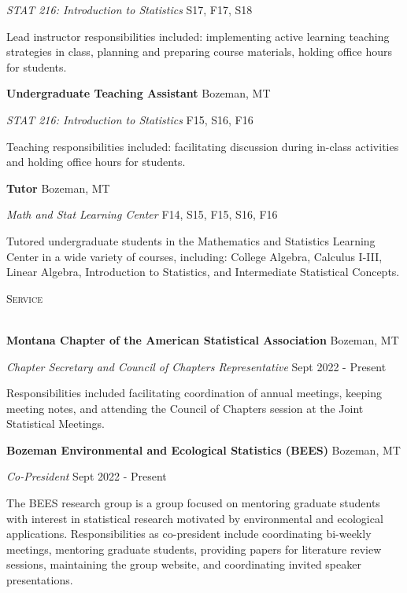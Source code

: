 \documentclass[a4paper]{article}
\newcommand{\lineunder} {
	\vspace*{-8pt} \\
	\hspace*{-18pt} \hrulefill \\
}
\newcommand{\header} [1] {
	{\hspace*{-18pt}\vspace*{6pt} \textcolor{Cerulean}{\textsc{#1}}}
	\vspace*{-6pt} \textcolor{Cerulean}{\lineunder}
}
\begin{document}
\emph{STAT 216: Introduction to Statistics} \hfill S17, F17, S18

Lead instructor responsibilities included: implementing active learning
teaching strategies in class, planning and preparing course materials,
holding office hours for students. \vspace*{2mm}

\textbf{Undergraduate Teaching Assistant} \hfill Bozeman, MT

\emph{STAT 216: Introduction to Statistics} \hfill F15, S16, F16

Teaching responsibilities included: facilitating discussion during
in-class activities and holding office hours for students. \vspace*{2mm}

\textbf{Tutor} \hfill Bozeman, MT

\emph{Math and Stat Learning Center} \hfill F14, S15, F15, S16, F16

Tutored undergraduate students in the Mathematics and Statistics
Learning Center in a wide variety of courses, including: College
Algebra, Calculus I-III, Linear Algebra, Introduction to Statistics, and
Intermediate Statistical Concepts.\vspace*{2mm}

\header{Service}

\textbf{Montana Chapter of the American Statistical Association}
\hfill Bozeman, MT

\emph{Chapter Secretary and Council of Chapters Representative}
\hfill Sept 2022 - Present

Responsibilities included facilitating coordination of annual meetings,
keeping meeting notes, and attending the Council of Chapters session at
the Joint Statistical Meetings. \vspace*{2mm}

\textbf{Bozeman Environmental and Ecological Statistics (BEES)}
\hfill Bozeman, MT

\emph{Co-President} \hfill Sept 2022 - Present

The BEES research group is a group focused on mentoring graduate
students with interest in statistical research motivated by
environmental and ecological applications. Responsibilities as
co-president include coordinating bi-weekly meetings, mentoring graduate
students, providing papers for literature review sessions, maintaining
the group website, and coordinating invited speaker presentations.
\vspace*{2mm}
\end{document}
